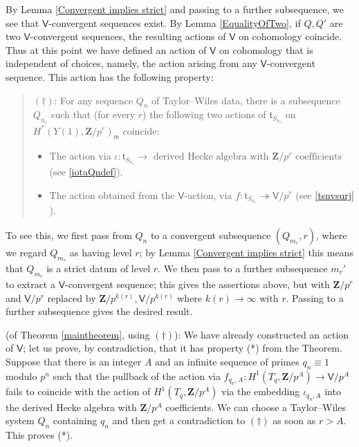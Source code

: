 \documentclass[10pt]{amsart}
\newcommand{\Z}{\mathbf{Z}}
\newcommand{\Vinf}{\mathsf{V}}
\theoremstyle{remark}
\begin{document}
By Lemma \ref{Convergent implies strict} and passing to a further subsequence,
we see that $\Vinf$-convergent sequences exist. 
By Lemma \ref{EqualityOfTwo}, if $Q, Q'$ are two $\Vinf$-convergent sequences, 
  the resulting actions of $\Vinf$ on cohomology coincide.  
Thus at this point we have defined an action of $\Vinf$ on cohomology that is independent of choices, namely,
the action arising from any $\Vinf$-convergent sequence. 
This 
  action has the following property: 
%
%
%
%
%
%
%
%
%
%
%
%
%
%
%
%
%
%
%
%
%
%
%
 \begin{quote}  $(\dagger)$:  For any sequence $Q_n$ of Taylor--Wiles data,  
there is a subsequence $Q_{n_r}$ 
 such that  (for every $r$) the following two actions of $\mathfrak{t}_{S_{n_r}}$ on  $H^*(Y(1), \Z/p^r)_{\mathfrak{m}}$ coincide:
 
 \begin{itemize}
\item  The action via $\iota: \mathfrak{t}_{S_{n_r}} \rightarrow \mbox{ derived Hecke algebra with $\Z/p^r$ coefficients}$ (see \eqref{iotaQndef}). 
 \item The action obtained from the $\Vinf$-action, via   $f: \mathfrak{t}_{S_{n_r}} \twoheadrightarrow \Vinf/p^r$
(see   \eqref{tsnvsurj} ). 
\end{itemize} 
   \end{quote}  
  To see this, we first pass from $Q_n$ to a convergent subsequence 
  $(Q_{m_r}, r)$, where we regard $Q_{m_r}$ as having level $r$;
by Lemma \ref{Convergent implies strict} this means 
that  $Q_{m_r}$ is
  a strict datum of level $r$. We then pass to a further  subsequence $m_r'$
  to extract a $\Vinf$-convergent sequence; this gives the assertions above,
  but with $\Z/p^r$ and $\Vinf/p^r$ replaced by $\Z/p^{k(r)}, \Vinf/p^{k(r)}$
  where $k(r) \rightarrow \infty$ with $r$. Passing to a further subsequence gives the desired result. 
  
%
 

 
 
 
  
 \proof (of Theorem \ref{maintheorem}, using $(\dagger)$): 
We have already constructed an action of $\Vinf$; let us prove, by contradiction, that it has property (*)
from the Theorem. 
Suppose that there is an integer $A$ and an infinite sequence of primes $q_n \equiv 1$ modulo $ p^n$
such that the pullback of the action via $ f_{q_n,A}: H^1(T_q, \Z/p^A) \rightarrow \Vinf/p^A$ 
fails to coincide with the action of $H^1(T_q, \Z/p^A)$ via the  embedding $\iota_{q_n, A}$ into the derived Hecke algebra with $\Z/p^A$ coefficients. 
We can choose a Taylor--Wiles system $Q_n$  containing $q_n$ and then get a contradiction to $(\dagger)$
as soon as $r > A$.  This proves (*). 
 
\end{document}
